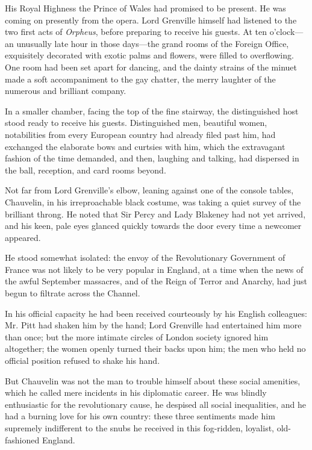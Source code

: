 \documentclass[paper=5.5in:8.5in,BCOR=7mm,twoside,DIV=calc,12pt,usegeometry,chapterprefix,endperiod,headings=big]{scrbook}
\begin{document}
His Royal Highness the Prince of Wales had promised to be present. He was coming on presently from the opera. Lord Grenville himself had listened to the two first acts of \textit{Orpheus}, before preparing to receive his guests. At ten o'clock---an unusually late hour in those days---the grand rooms of the Foreign Office, exquisitely decorated with exotic palms and flowers, were filled to overflowing. One room had been set apart for dancing, and the dainty strains of the minuet made a soft accompaniment to the gay chatter, the merry laughter of the numerous and brilliant company.

In a smaller chamber, facing the top of the fine stairway, the distinguished host stood ready to receive his guests. Distinguished men, beautiful women, notabilities from every European country had already filed past him, had exchanged the elaborate bows and curtsies with him, which the extravagant fashion of the time demanded, and then, laughing and talking, had dispersed in the ball, reception, and card rooms beyond.

Not far from Lord Grenville's elbow, leaning against one of the console tables, Chauvelin, in his irreproachable black costume, was taking a quiet survey of the brilliant throng. He noted that Sir Percy and Lady Blakeney had not yet arrived, and his keen, pale eyes glanced quickly towards the door every time a newcomer appeared.

He stood somewhat isolated: the envoy of the Revolutionary Government of France was not likely to be very popular in England, at a time when the news of the awful September massacres, and of the Reign of Terror and Anarchy, had just begun to filtrate across the Channel.

In his official capacity he had been received courteously by his English colleagues: Mr. Pitt had shaken him by the hand; Lord Grenville had entertained him more than once; but the more intimate circles of London society ignored him altogether; the women openly turned their backs upon him; the men who held no official position refused to shake his hand.

But Chauvelin was not the man to trouble himself about these social amenities, which he called mere incidents in his diplomatic career. He was blindly enthusiastic for the revolutionary cause, he despised all social inequalities, and he had a burning love for his own country: these three sentiments made him supremely indifferent to the snubs he received in this fog-ridden, loyalist, old-fashioned England.
\end{document}
